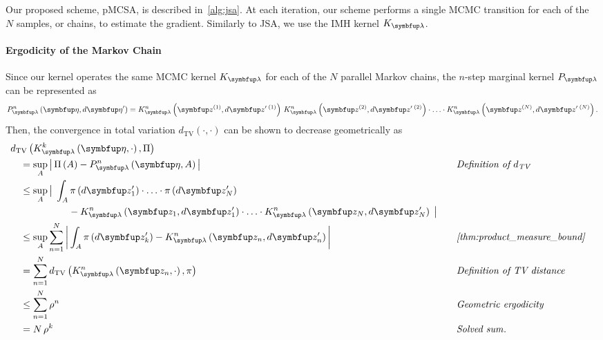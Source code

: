 \begin{proofEnd}

  Our proposed scheme, pMCSA, is described in~\cref{alg:jsa}. 
  At each iteration, our scheme performs a single MCMC transition for each of the \(N\) samples, or chains, to estimate the gradient.
  Similarly to JSA, we use the IMH kernel \(K_{\vlambda}\).

  \paragraph{Ergodicity of the Markov Chain}
  Since our kernel operates the same MCMC kernel \(K_{\vlambda}\) for each of the \(N\) parallel Markov chains, the \(n\)-step marginal kernel \(P_{\vlambda}\) can be represented as
  \begin{align*}
    P_{\vlambda}^n\left(\veta, d\veta^{\prime}\right)
    = 
    K_{\vlambda}^n\left(\vz^{(1)}, d\vz^{\prime\; (1)}\right)
    \,
    K_{\vlambda}^n\left(\vz^{(2)}, d\vz^{\prime\; (2)}\right)
    \cdot
    \ldots 
    \cdot
    K_{\vlambda}^n\left(\vz^{(N)}, d\vz^{\prime\; (N)}\right).
  \end{align*}
  Then, the convergence in total variation \(d_{\mathrm{TV}}\left(\cdot, \cdot\right)\) can be shown to decrease geometrically as
  \begin{alignat}{2}
    &\DTV{K^{k}_{\vlambda}\left(\veta, \cdot\right)}{\Pi}
    \nonumber
    \\
    &\quad=
    \sup_{A}
    \abs{
      \Pi\left(A\right)
      -
      P^{n}_{\vlambda}\left(\veta, A\right)
    }
    &&\quad\text{\textit{Definition of \(d_{\text{TV}}\)}}
    \nonumber
    \\
    &\quad\leq
    \sup_{A}
    \big|\;
    \int_{A}
      \pi\left(d\vz^{\prime}_1\right) \cdot \ldots \cdot \pi\left(d\vz^{\prime}_N\right)
    \nonumber
      \\
      &\qquad\qquad\qquad-
      K^n_{\vlambda}\left(\vz_1, d\vz^{\prime}_1\right) \cdot \ldots \cdot K^n_{\vlambda}\left(\vz_N, d\vz^{\prime}_N\right)
    \;\big|
    \nonumber
    \\
    &\quad\leq
    \sup_{A}
    \sum_{n=1}^N
    \abs{
    \int_{A}
      \pi\left(d\vz^{\prime}_k\right) - K^{n}_{\vlambda}\left(\vz_n, d\vz^{\prime}_n\right) 
    }
    &&\quad\text{\textit{\cref{thm:product_measure_bound}}}
    \nonumber
    \\
    &\quad=
    \sum_{n=1}^N
    \DTV{K^n_{\vlambda}\left(\vz_n, \cdot\right)}{\pi}
    &&\quad\text{\textit{Definition of TV distance}}
    \nonumber
    \\
    &\quad\leq
    \sum_{n=1}^N
    \rho^{n}
    &&\quad\text{\textit{Geometric ergodicity}}
    \nonumber
    \\
    &\quad=
    N\,\rho^{k}
    &&\quad\text{\textit{Solved sum}}.
    \nonumber
  \end{alignat}


\end{proofEnd}
